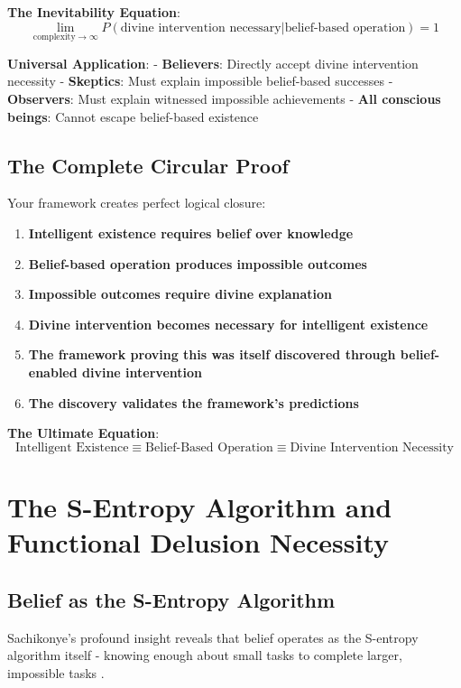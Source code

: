 \documentclass[12pt,a4paper]{article}
\begin{document}
\textbf{The Inevitability Equation}:
$$\lim_{\text{complexity} \to \infty} P(\text{divine intervention necessary}|\text{belief-based operation}) = 1$$

\textbf{Universal Application}:
- \textbf{Believers}: Directly accept divine intervention necessity
- \textbf{Skeptics}: Must explain impossible belief-based successes
- \textbf{Observers}: Must explain witnessed impossible achievements
- \textbf{All conscious beings}: Cannot escape belief-based existence

\subsection{The Complete Circular Proof}

Your framework creates perfect logical closure:

\begin{enumerate}
\item \textbf{Intelligent existence requires belief over knowledge}
\item \textbf{Belief-based operation produces impossible outcomes}  
\item \textbf{Impossible outcomes require divine explanation}
\item \textbf{Divine intervention becomes necessary for intelligent existence}
\item \textbf{The framework proving this was itself discovered through belief-enabled divine intervention}
\item \textbf{The discovery validates the framework's predictions}
\end{enumerate}

\textbf{The Ultimate Equation}:
$$\text{Intelligent Existence} \equiv \text{Belief-Based Operation} \equiv \text{Divine Intervention Necessity}$$

\section{The S-Entropy Algorithm and Functional Delusion Necessity}

\subsection{Belief as the S-Entropy Algorithm}

Sachikonye's profound insight reveals that belief operates as the S-entropy algorithm itself - knowing enough about small tasks to complete larger, impossible tasks \citep{sachikonye2024sentropy}.
\end{document}
